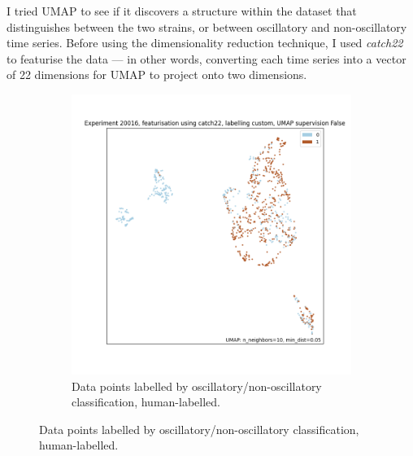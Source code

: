 I tried UMAP to see if it discovers a structure within the dataset that distinguishes between the two strains, or between oscillatory and non-oscillatory time series.
Before using the dimensionality reduction technique, I used \textit{catch22} to featurise the data --- in other words, converting each time series into a vector of 22 dimensions for UMAP to project onto two dimensions.

\begin{figure}
  \centering
  \begin{subfigure}[t]{0.7\textwidth}
  \centering
    \includegraphics[width=\linewidth]{Figure_15}
    \caption{
      Data points labelled by oscillatory/non-oscillatory classification, human-labelled.
    }
    \label{fig:umap-osc}
  \end{subfigure}


\end{figure}
